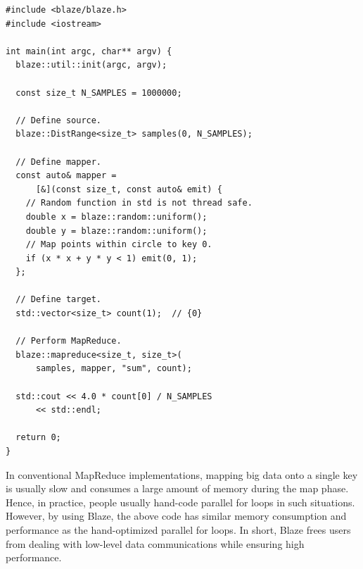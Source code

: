 \begin{lstlisting}
#include <blaze/blaze.h>
#include <iostream>

int main(int argc, char** argv) {
  blaze::util::init(argc, argv);
  
  const size_t N_SAMPLES = 1000000;

  // Define source.
  blaze::DistRange<size_t> samples(0, N_SAMPLES);

  // Define mapper.
  const auto& mapper = 
      [&](const size_t, const auto& emit) {
    // Random function in std is not thread safe.
    double x = blaze::random::uniform();
    double y = blaze::random::uniform();
    // Map points within circle to key 0.
    if (x * x + y * y < 1) emit(0, 1);
  };

  // Define target.
  std::vector<size_t> count(1);  // {0}

  // Perform MapReduce.
  blaze::mapreduce<size_t, size_t>(
      samples, mapper, "sum", count);

  std::cout << 4.0 * count[0] / N_SAMPLES
      << std::endl;
  
  return 0;
}
\end{lstlisting}


In conventional MapReduce implementations, mapping big data onto a single key is usually slow and consumes a large amount of memory during the map phase.
Hence, in practice, people usually hand-code parallel for loops in such situations.
However, by using Blaze, the above code has similar memory consumption and performance as the hand-optimized parallel for loops.
In short, Blaze frees users from dealing with low-level data communications while ensuring high performance.
